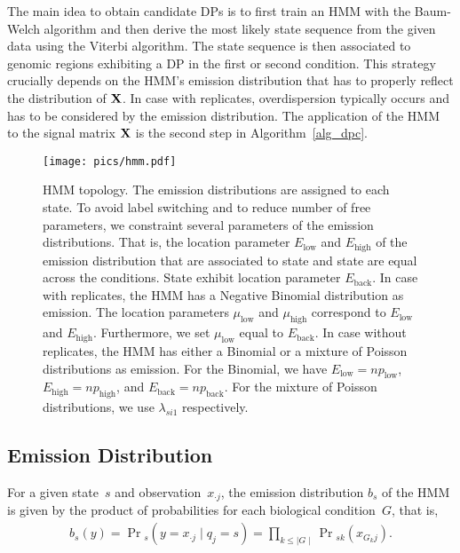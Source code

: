 The main idea to obtain candidate DPs is to first train an HMM with the Baum-Welch algorithm and then derive the most likely state sequence from the given data using the Viterbi algorithm.
The state sequence is then associated to genomic regions exhibiting a DP in the first or second condition.
This strategy crucially depends on the HMM's emission distribution that has to properly reflect the distribution of $\mathbf{X}$.
In case with replicates, overdispersion typically occurs and has to be considered by the emission distribution. 
The application of the HMM to the signal matrix $\mathbf{X}$ is the second step in Algorithm~\ref{alg_dpc}.


\begin{figure}[ht]
  \centering
  \texttt{[image: pics/hmm.pdf]}
\caption[Hidden Markov model topology]{HMM topology. 
The emission distributions are assigned to each state. 
To avoid label switching and to reduce number of free parameters, we constraint several parameters of the emission distributions. 
That is, the location parameter $E_\text{low}$ and $E_\text{high}$ of the emission distribution that are associated to state  and state  are equal across the conditions.
State  exhibit location parameter $E_\text{back}$.
In case with replicates, the HMM has a Negative Binomial distribution as emission.
The location parameters $\mu_{\text{low}}$ and $\mu_{\text{high}}$ correspond to $E_\text{low}$ and $E_\text{high}$.
Furthermore, we set $\mu_{\text{low}}$ equal to $E_\text{back}$.
In case without replicates, the HMM has either a Binomial or a mixture of Poisson distributions as emission.
For the Binomial, we have $E_\text{low} = n p_{\text{low}}$, $E_\text{high} = n p_{\text{high}}$, and $E_\text{back} = n p_{\text{back}}.$
For the mixture of Poisson distributions, we use $\lambda_{si1}$ respectively.
}
\label{pic_hmm}
\end{figure}


\subsection{Emission Distribution}
For a given state~$s$ and observation~$x_{\cdot j}$, the emission distribution $b_s$ of the HMM is given by the product of probabilities for each biological condition~$G$, that is,
\begin{align}
 b_s(y) = \Pr\textstyle_{s}(y = x_{\cdot j} \mid q_j = s)= \prod_{k \leq \mid G \mid} \Pr\textstyle_{sk}(x_{G_kj}). \label{eq_hmm_em_emmission}
\end{align}

